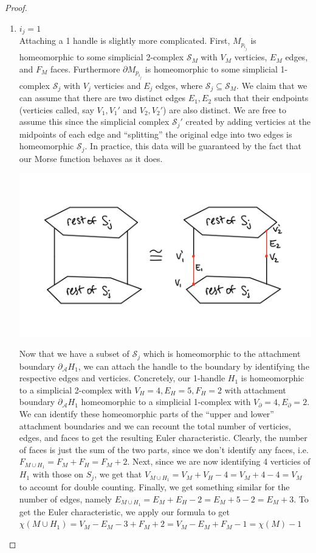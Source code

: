 \documentclass[12pt]{article}
\newcommand{\cA}{{\mathcal A}}
\newcommand{\cS}{{\mathcal S}}
\theoremstyle{definition}
\begin{document}
\begin{proof}
\begin{enumerate}
            \item $i_j = 1$\\
            Attaching a 1 handle is slightly more complicated. First, $M_{p_{i_j}}$ is homeomorphic to some simplicial 2-complex $\cS_M$ with $V_M$ verticies, $E_M$ edges, and $F_M$ faces. Furthermore $\partial M_{p_{i_j}}$ is homeomorphic to some simplicial 1-complex $\cS_j$ with $V_j$ verticies and $E_j$ edges, where $\cS_j \subseteq \cS_M$. We claim that we can assume that there are two distinct edges $E_1, E_2$ such that their endpoints (verticies called, say $V_1, V_1'$ and $V_2,V_2'$) are also distinct. We are free to assume this since the simplicial complex $\cS_j'$ created by adding verticies at the midpoints of each edge and ``splitting'' the original edge into two edges is homeomorphic $\cS_j$. In practice, this data will be guaranteed by the fact that our Morse function behaves as it does. 
            \begin{center}
                  \includegraphics[scale = 0.4]{sim.png}
            \end{center}
            Now that we have a subset of $\cS_j$ which is homeomorphic to the attachment boundary $\partial_\cA H_1$, we can attach the handle to the boundary by identifying the respective edges and verticies. Concretely, our 1-handle $H_1$ is homeomorphic to a simplicial 2-complex with $V_H = 4, E_H = 5, F_H = 2$ with attachment boundary $\partial_\cA H_1$ homeomorphic to a simplicial 1-complex with $V_\partial = 4, E_\partial = 2$. We can identify these homeomorphic parts of the ``upper and lower'' attachment boundaries and we can recount the total number of verticies, edges, and faces to get the resulting Euler characteristic. Clearly, the number of faces is just the sum of the two parts, since we don't identify any faces, i.e. $F_{M\cup H_1} = F_M + F_H = F_M + 2$. Next, since we are now identifying 4 verticies of $H_1$ with those on $S_j$, we get that $V_{M\cup H_1} = V_M + V_H - 4 = V_M + 4 - 4 = V_M$ to account for double counting. Finally, we get something similar for the number of edges, namely $E_{M\cup H_1} = E_M + E_H - 2 = E_M + 5 - 2 = E_M + 3$. To get the Euler characteristic, we apply our formula to get $\chi(M \cup H_1) = V_M - E_M - 3 + F_M + 2 = V_M - E_M+ F_M -1 = \chi(M)-1$
            


\end{enumerate}
\end{proof}
\end{document}
